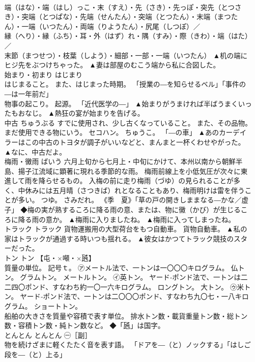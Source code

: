 \documentclass[8pt]{extreport}
\begin{document}
\begin{CJK}{UTF8}{min}
\\	端（はな）・端（はし）っこ・末（すえ）・先（さき）・先っぽ・突先（とつさき）・突端（とつぱな）・先端（せんたん）・突端（とつたん）・末端（まつたん）・一端（いつたん）・両端（りようたん）・尻尾（しつぽ）／
\\	縁（へり）・縁（ふち）・耳・外（はず）れ・隅（すみ）・際（きわ）・端（はた）／
\\	末節（まつせつ）・枝葉（しよう）・細部・一部・一端（いつたん）	▲机の端にヒジ先をぶつけちゃった。 ▲妻は部屋のむこう端から私に合図した。
\\	始まり・初まり	はじまり	
\\	はじまること。 また、はじまった時期。 「授業の―を知らせるベル」「事件の―は一年前だ」 
\\	物事の起こり。 起源。 「近代医学の―」	▲始まりがうまければ半ばうまくいったもおなじ。 ▲熱狂の宴が始まりを告げる。
\\	中古	ちゅうぶる	すでに使用され、少し古くなっていること。 また、その品物。 まだ使用できる物にいう。 セコハン。 ちゅうこ。 「―の車」	▲あのカーデイラーはこの中古のトヨタが調子がいいなどと、まんまと一杯くわせやがった。 ▲なに、中古だよ。
\\	梅雨・黴雨	ばいう	六月上旬から七月上・中旬にかけて、本州以南から朝鮮半島、揚子江流域に顕著に現れる季節的な雨。 梅雨前線上を小低気圧が次々に東進して雨を降らせるもの。 入梅の前に走り梅雨（づゆ）の見られることが多く、中休みには五月晴（さつきば）れとなることもあり、梅雨明けは雷を伴うことが多い。 つゆ。 さみだれ。 《季　夏》「草の戸の開きしままなる―かな／虚子」 ◆梅の実が熟するころに降る雨の意、または、物に黴（かび）が生じるころに降る雨の意か。	▲梅雨に入りましたね。 ▲梅雨に入ってしまったね。
\\	トラック	トラック	貨物運搬用の大型荷台をもつ自動車。 貨物自動車。	▲私の家はトラックが通過する時いつも揺れる。 ▲彼女はかつてトラック競技のスターだった。
\\	トン	トン	【屯・×噸・×瓲】 
\\	質量の単位。 記号ｔ。 ㋐メートル法で、一トンは一〇〇〇キログラム。 仏トン。 グラムトン。 メートルトン。 ㋑英トン。 ヤード‐ポンド法で、一トンは二二四〇ポンド、すなわち約一〇一六キログラム。 ロングトン。 大トン。 ㋒米トン。 ヤード‐ポンド法で、一トンは二〇〇〇ポンド、すなわち九〇七・一八キログラム。 ショートトン。 
\\	船舶の大きさを質量や容積で表す単位。 排水トン数・載貨重量トン数・総トン数・容積トン数・純トン数など。 ◆「瓲」は国字。	
\\	とんとん	とんとん	㊀［副］ 
\\	物を続けざまに軽くたたく音を表す語。 「ドアを―（と）ノックする」「はしご段を―（と）上る」 

\end{CJK}
\end{document}
